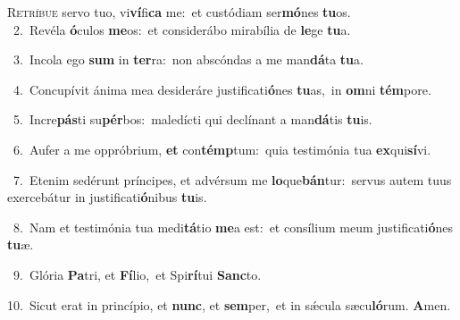 \lettrine{\initial\textcolor{\initialcolor}{R}}{etríbue} servo tuo, vi\-\textbf{ví}\-fi\textbf{ca} me:~\star et custódiam ser\-\textbf{mó}\-nes \textbf{tu}\-os.\\
{\numbfont\textcolor{\numbcolor}{~2.}}~Revéla \textbf{ó}\-culos \textbf{me}\-os:~\star et considerábo mirabília de \textbf{le}\-ge \textbf{tu}\-a.\par
{\numbfont\textcolor{\numbcolor}{~3.}}~Incola ego \textbf{sum} in \textbf{ter}\-ra:~\star non abscóndas a me man\-\textbf{dá}\-ta \textbf{tu}\-a.\par
{\numbfont\textcolor{\numbcolor}{~4.}}~Concupívit ánima mea desideráre justificati\-\textbf{ó}\-nes \textbf{tu}\-as,~\star in \textbf{om}\-ni \textbf{tém}\-pore.\par
{\numbfont\textcolor{\numbcolor}{~5.}}~Incre\-\textbf{pás}\-ti su\-\textbf{pér}\-bos:~\star maledícti qui declínant a man\-\textbf{dá}\-tis \textbf{tu}\-is.\par
{\numbfont\textcolor{\numbcolor}{~6.}}~Aufer a me oppróbrium, \textbf{et} con\-\textbf{témp}\-tum:~\star quia testimónia tua \textbf{ex}\-qui\-\textbf{sí}\-vi.\par
{\numbfont\textcolor{\numbcolor}{~7.}}~Etenim sedérunt príncipes, et advérsum me \textbf{lo}\-que\-\textbf{bán}\-tur:~\star servus autem tuus exercebátur in justificati\-\textbf{ó}\-nibus \textbf{tu}\-is.\par
{\numbfont\textcolor{\numbcolor}{~8.}}~Nam et testimónia tua medi\-\textbf{tá}\-tio \textbf{me}\-a est:~\star et consílium meum justificati\-\textbf{ó}\-nes \textbf{tu}\-æ.\par
{\numbfont\textcolor{\numbcolor}{~9.}}~Glória \textbf{Pa}\-tri, et \textbf{Fí}\-lio,~\star et Spi\-\textbf{rí}\-tui \textbf{Sanc}\-to.\par
{\numbfont\textcolor{\numbcolor}{10.}}~Sicut erat in princípio, et \textbf{nunc}\-, et \textbf{sem}\-per,~\star et in sǽcula sæcu\-\textbf{ló}\-rum. \textbf{A}\-men.\par
